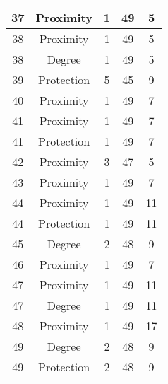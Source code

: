 \documentclass[results.tex]{subfiles}
\begin{document}
\begin{center}
\begin{tabular}{| c || c | c | c | c |}
    \hline
    37 & Proximity & 1 & 49 & 5 \\ 
    \hline
    38 & Proximity & 1 & 49 & 5 \\ 
    \hline
    38 & Degree & 1 & 49 & 5 \\ 
    \hline
    39 & Protection & 5 & 45 & 9 \\ 
    \hline
    40 & Proximity & 1 & 49 & 7 \\ 
    \hline
    41 & Proximity & 1 & 49 & 7 \\ 
    \hline
    41 & Protection & 1 & 49 & 7 \\ 
    \hline
    42 & Proximity & 3 & 47 & 5 \\ 
    \hline
    43 & Proximity & 1 & 49 & 7 \\ 
    \hline
    44 & Proximity & 1 & 49 & 11 \\ 
    \hline
    44 & Protection & 1 & 49 & 11 \\ 
    \hline
    45 & Degree & 2 & 48 & 9 \\ 
    \hline
    46 & Proximity & 1 & 49 & 7 \\ 
    \hline
    47 & Proximity & 1 & 49 & 11 \\ 
    \hline
    47 & Degree & 1 & 49 & 11 \\ 
    \hline
    48 & Proximity & 1 & 49 & 17 \\ 
    \hline
    49 & Degree & 2 & 48 & 9 \\ 
    \hline
    49 & Protection & 2 & 48 & 9 \\ 
    \hline   \end{tabular}
\end{center}
\end{document}
